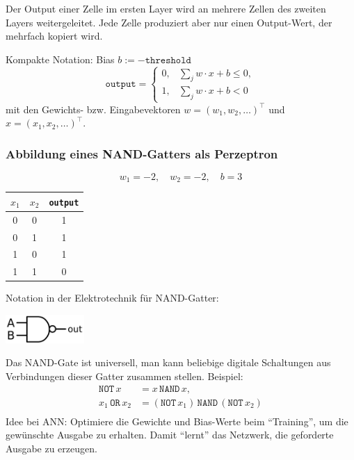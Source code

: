 \documentclass[
 a4paper,
 12pt,
 parskip=half
 ]{scrreprt}
\theoremstyle{plain}
\theoremstyle{definition}
\newcommand{\thr}{\texttt{threshold}}
\begin{document}
Der Output einer Zelle im ersten Layer wird an mehrere Zellen des zweiten Layers
weitergeleitet. Jede Zelle produziert aber nur einen Output-Wert, der mehrfach
kopiert wird. 

Kompakte Notation: Bias $b := - \thr$
\[ \texttt{output} =
  \begin{cases}
    0, & \sum_j w \cdot x + b \le 0, \\
    1, & \sum_j w \cdot x + b < 0
  \end{cases}
\]
mit den Gewichts- bzw. Eingabevektoren $w = (w_1, w_2, \ldots)^\top$ und $x =
(x_1, x_2, \ldots)^\top$.

\subsubsection*{Abbildung eines NAND-Gatters als Perzeptron}
\[ w_1 = -2, \quad w_2 = -2, \quad b = 3 \]
\begin{center}
  \begin{minipage}{6cm}
    \begin{center}
      \begin{tabular}{cc|c}
        $x_1$ & $x_2$ & \texttt{output} \\
        \hline
        0 & 0 & 1 \\
        0 & 1 & 1 \\
        1 & 0 & 1 \\
        1 & 1 & 0
      \end{tabular}
    \end{center}
  \end{minipage}
  \begin{minipage}{6cm}
    Notation in der Elektrotechnik für NAND-Gatter:
    \begin{center}
      \includegraphics[width=3cm]{img/nand}
    \end{center}
  \end{minipage}
\end{center}

Das NAND-Gate ist universell, man kann beliebige digitale Schaltungen aus
Verbindungen dieser Gatter zusammen stellen. Beispiel:
\begin{align*}
  \texttt{NOT} \, x
  &= x \, \texttt{NAND} \, x, \\
  x_1 \, \texttt{OR} \, x_2
  &= (\texttt{NOT} \, x_1) \, \texttt{NAND} \, (\texttt{NOT} \, x_2) \\
\end{align*}
Idee bei ANN: Optimiere die Gewichte und Bias-Werte beim ``Training'', um die
gewünschte Ausgabe zu erhalten. Damit ``lernt'' das Netzwerk, die geforderte
Ausgabe zu erzeugen.
\end{document}
